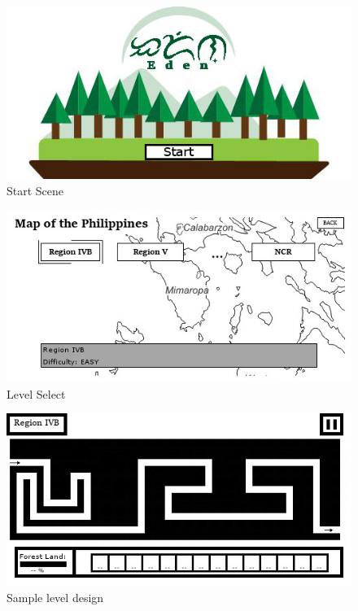 \documentclass[journal]{./IEEE/IEEEtran}
\begin{document}
\begin{figure}\centering
\label{start}
\includegraphics[width=\linewidth]{[Eden]Start.jpg}
\caption{Start Scene}
\end{figure}
\begin{figure}\centering
\label{map}
\includegraphics[width=\linewidth]{[Eden]Map.jpg}
\caption{Level Select}
\end{figure}
\begin{figure}\centering
\label{level}
\includegraphics[width=\linewidth]{[Eden]Level.jpg}
\caption{Sample level design}
\end{figure}
\end{document}
